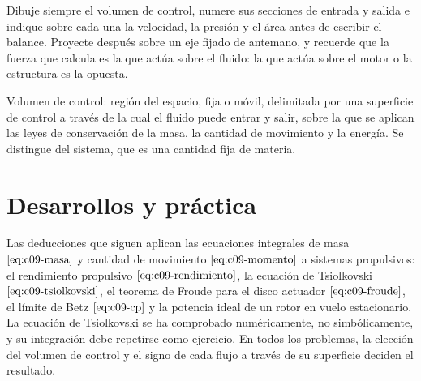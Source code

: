 \documentclass[10pt,openany]{book}
\begin{document}
\begin{tcolorbox}[title={Consejo}, studiumtip, breakable]

Dibuje siempre el volumen de control, numere sus secciones de entrada y salida e indique sobre cada una la velocidad, la presión y el área antes de escribir el balance. Proyecte después sobre un eje fijado de antemano, y recuerde que la fuerza que calcula es la que actúa sobre el fluido: la que actúa sobre el motor o la estructura es la opuesta.
\end{tcolorbox}

\begin{tcolorbox}[title={Definición}, studiumdef, breakable]

Volumen de control: región del espacio, fija o móvil, delimitada por una superficie de control a través de la cual el fluido puede entrar y salir, sobre la que se aplican las leyes de conservación de la masa, la cantidad de movimiento y la energía. Se distingue del sistema, que es una cantidad fija de materia.
\end{tcolorbox}



\section{Desarrollos y práctica}

Las deducciones que siguen aplican las ecuaciones integrales de masa \(\eqref{eq:c09-masa}\) y cantidad de movimiento \(\eqref{eq:c09-momento}\) a sistemas propulsivos: el rendimiento propulsivo \(\eqref{eq:c09-rendimiento}\), la ecuación de Tsiolkovski \(\eqref{eq:c09-tsiolkovski}\), el teorema de Froude para el disco actuador \(\eqref{eq:c09-froude}\), el límite de Betz \(\eqref{eq:c09-cp}\) y la potencia ideal de un rotor en vuelo estacionario. La ecuación de Tsiolkovski se ha comprobado numéricamente, no simbólicamente, y su integración debe repetirse como ejercicio. En todos los problemas, la elección del volumen de control y el signo de cada flujo a través de su superficie deciden el resultado.
\end{document}
